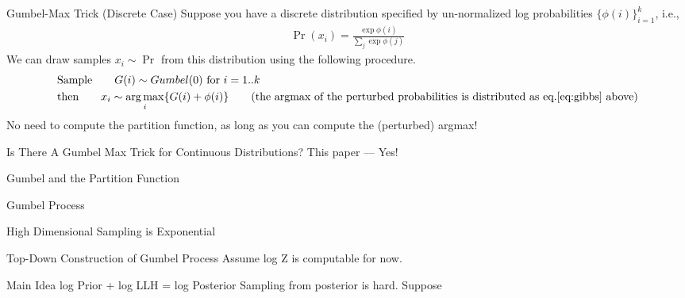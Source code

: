 \begin{frame}{Gumbel-Max Trick (Discrete Case)}
  Suppose you have a discrete distribution specified by un-normalized log probabilities $\{\phi(i)\}_{i=1}^{k}$, i.e.,
  \begin{align}
    \Pr(x_i) = \frac{\exp\phi(i)}{\sum_j\exp\phi(j)} \label{eq:gibbs}
  \end{align}
  We can draw samples $x_i \sim \Pr$ from this distribution using the following procedure.
  \begin{align*}
    & \text{Sample} \qquad G(i) \sim Gumbel(0) \text{ for } i=1..k\\
    & \text{then} \qquad x_i \sim \argmax_i \{G(i) +\phi(i)\} \tag{the argmax of the perturbed probabilities is distributed as eq.\ref{eq:gibbs} above}
  \end{align*}
  No need to compute the partition function, as long as you can compute the (perturbed) argmax!
\end{frame}

\begin{frame}{Is There A Gumbel Max Trick for Continuous Distributions?}
  This paper --- Yes!
\end{frame}

\begin{frame}{Gumbel and the Partition Function}
  
\end{frame}

\begin{frame}{Gumbel Process}
\end{frame}

\begin{frame}{High Dimensional Sampling is Exponential}

\end{frame}

\begin{frame}{Top-Down Construction of Gumbel Process}
  Assume log Z is computable for now.
\end{frame}

\begin{frame}{Main Idea}
  log Prior + log LLH = log Posterior
  Sampling from posterior is hard.
  Suppose 
\end{frame}

